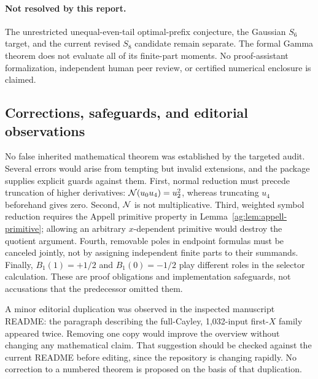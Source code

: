 \paragraph{Not resolved by this report.}
The unrestricted unequal-even-tail optimal-prefix conjecture, the
Gaussian $S_6$ target, and the current revised $S_8$ candidate remain
separate. The formal Gamma theorem does not evaluate all of its
finite-part moments. No proof-assistant formalization, independent
human peer review, or certified numerical enclosure is claimed.

\subsection{Corrections, safeguards, and editorial observations}
No false inherited mathematical theorem was established by the targeted
audit. Several errors would arise from tempting but invalid extensions,
and the package supplies explicit guards against them.
First, normal reduction must precede truncation of higher derivatives:
$\mathcal N(u_0u_4)=u_2^2$, whereas truncating $u_4$ beforehand gives zero.
Second, $\mathcal N$ is not multiplicative. Third, weighted symbol reduction
requires the Appell primitive property in
Lemma~\ref{ag:lem:appell-primitive}; allowing an arbitrary
$x$-dependent primitive would destroy the quotient argument. Fourth,
removable poles in endpoint formulas must be canceled jointly, not
by assigning independent finite parts to their summands. Finally,
$B_1(1)=+1/2$ and $B_1(0)=-1/2$ play different roles in the selector
calculation. These are proof obligations and implementation safeguards,
not accusations that the predecessor omitted them.

A minor editorial duplication was observed in the inspected manuscript
README: the paragraph describing the full-Cayley, 1,032-input first-$X$
family appeared twice. Removing one copy would improve the overview
without changing any mathematical claim. That suggestion should be
checked against the current README before editing, since the repository
is changing rapidly. No correction to a numbered theorem is proposed
on the basis of that duplication.

